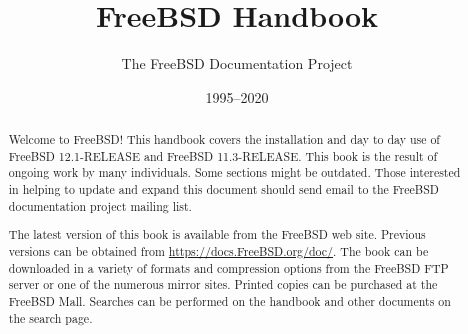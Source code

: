 \documentclass[a4paper,11pt]{memoir}
\title{FreeBSD Handbook}
\author{The FreeBSD Documentation Project}
\date{1995--2020}
\begin{document}
\frontmatter

\maketitle
\thispagestyle{empty}

\clearforchapter
\maketitle
\begin{abstract}
\noindent
Welcome to FreeBSD! This handbook covers the installation and day to day use of
FreeBSD 12.1-RELEASE and FreeBSD 11.3-RELEASE.
This book is the result of ongoing work by many individuals. Some sections might
be outdated.
Those interested in helping to update and expand this document should send email
to the FreeBSD documentation project mailing list.

The latest version of this book is available from the FreeBSD web site.
Previous versions can be obtained from \url{https://docs.FreeBSD.org/doc/}.
The book can be downloaded in a variety of formats and compression options from
the FreeBSD FTP server or one of the numerous mirror sites.
Printed copies can be purchased at the FreeBSD Mall.
Searches can be performed on the handbook and other documents on the search
page.
\end{abstract}


\clearforchapter\tableofcontents*

\mainmatter



\end{document}
